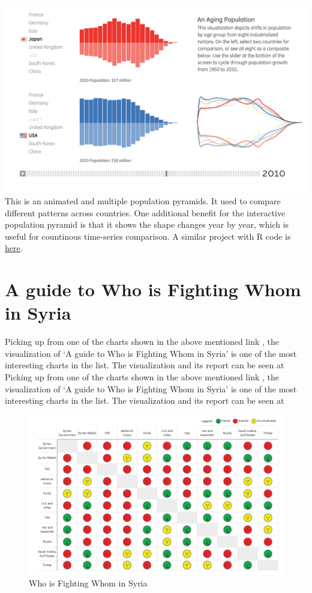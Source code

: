 \documentclass[]{book}
\theoremstyle{definition}
\theoremstyle{definition}
\theoremstyle{definition}
\theoremstyle{remark}
\begin{document}
\includegraphics{images/3_1.png} This is an animated and multiple
population pyramids. It used to compare different patterns across
countries. One additional benefit for the interactive population pyramid
is that it shows the shape changes year by year, which is useful for
countinous time-series comparison. A similar project with R code is
\href{https://www.r-bloggers.com/who-is-old-visualizing-the-concept-of-prospective-ageing-with-animated-population-pyramids/}{here}.

\section{A guide to Who is Fighting Whom in
Syria}\label{a-guide-to-who-is-fighting-whom-in-syria}

Picking up from one of the charts shown in the above mentioned link
\citep{int_viz_1}, the visualization of `A guide to Who is Fighting Whom
in Syria' is one of the most interesting charts in the list. The
visualization and its report can be seen at \citep{syria_chart} Picking
up from one of the charts shown in the above mentioned link
\citep{int_viz_1}, the visualization of `A guide to Who is Fighting Whom
in Syria' is one of the most interesting charts in the list. The
visualization and its report can be seen at

\begin{figure}
\centering
\includegraphics{images/img_syria_summary.PNG}
\caption{Who is Fighting Whom in Syria}
\end{figure}
\end{document}
